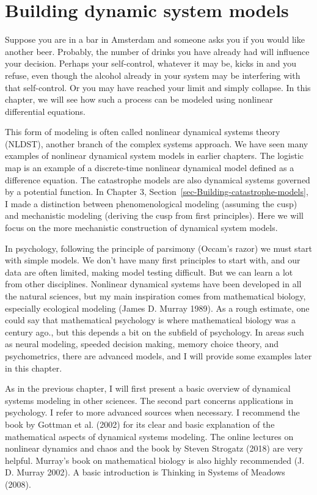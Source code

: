 \documentclass[
  a4paper,
  DIV=11,
  numbers=noendperiod]{scrreprt}
\begin{document}

\hypertarget{sec-ch4n}{%
\chapter{Building dynamic system models}\label{sec-ch4n}}

Suppose you are in a bar in Amsterdam and someone asks you if you would
like another beer. Probably, the number of drinks you have already had
will influence your decision. Perhaps your self-control, whatever it may
be, kicks in and you refuse, even though the alcohol already in your
system may be interfering with that self-control. Or you may have
reached your limit and simply collapse. In this chapter, we will see how
such a process can be modeled using nonlinear differential equations.

This form of modeling is often called nonlinear dynamical systems theory
(NLDST), another branch of the complex systems approach. We have seen
many examples of nonlinear dynamical system models in earlier chapters.
The logistic map is an example of a discrete-time nonlinear dynamical
model defined as a difference equation. The catastrophe models are also
dynamical systems governed by a potential function. In Chapter 3,
Section~\ref{sec-Building-catastrophe-models}, I made a distinction
between phenomenological modeling (assuming the cusp) and mechanistic
modeling (deriving the cusp from first principles). Here we will focus
on the more mechanistic construction of dynamical system models.

In psychology, following the principle of parsimony (Occam's razor) we
must start with simple models. We don't have many first principles to
start with, and our data are often limited, making model testing
difficult. But we can learn a lot from other disciplines. Nonlinear
dynamical systems have been developed in all the natural sciences, but
my main inspiration comes from mathematical biology, especially
ecological modeling (James D. Murray 1989). As a rough estimate, one
could say that mathematical psychology is where mathematical biology was
a century ago., but this depends a bit on the subfield of psychology. In
areas such as neural modeling, speeded decision making, memory choice
theory, and psychometrics, there are advanced models, and I will provide
some examples later in this chapter.

As in the previous chapter, I will first present a basic overview of
dynamical systems modeling in other sciences. The second part concerns
applications in psychology. I refer to more advanced sources when
necessary. I recommend the book by Gottman et al. (2002) for its clear
and basic explanation of the mathematical aspects of dynamical systems
modeling. The online lectures on nonlinear dynamics and chaos and the
book by Steven Strogatz (2018) are very helpful. Murray's book on
mathematical biology is also highly recommended (J. D. Murray 2002). A
basic introduction is Thinking in Systems of Meadows (2008).
\end{document}
